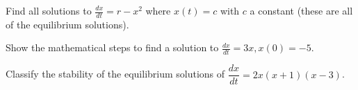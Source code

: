 \documentclass[12pt,letterpaper,noanswers]{exam}
\begin{document}
 \pdfpageheight 11in 
  \pdfpagewidth 8.5in



\begin{questions}
\question Find all solutions to $\frac{dx}{dt} = r-x^2$ where $x(t) = c$ with $c$ a constant (these are all of the equilibrium solutions).

\vfill

\item 
Show the mathematical steps to find a solution to $\frac{dx}{dt} = 3x, x(0) = -5$.

\vfill

\question Classify the stability of the equilibrium solutions of $\dfrac{dx}{dt} = 2x(x+1)(x-3)$.

\vfill

\end{questions}
\end{document}
